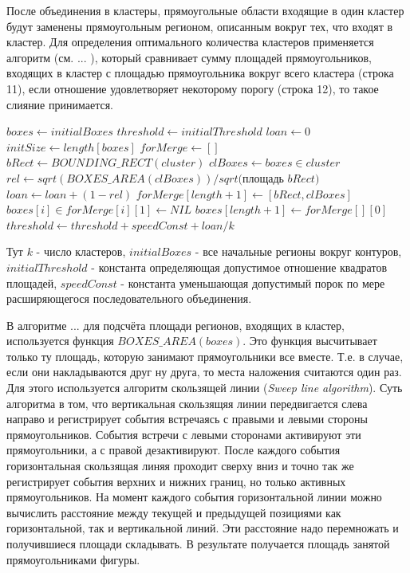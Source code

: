 \documentclass[12pt]{report}
\begin{document}
После объединения в кластеры, прямоугольные области входящие в один кластер будут заменены прямоугольным регионом, 
описанным вокруг тех, что входят в кластер. Для определения оптимального количества кластеров применяется алгоритм 
(см. ... ), который сравнивает сумму площадей прямоугольников, входящих в кластер с площадью прямоугольника вокруг 
всего кластера (строка 11), если отношение удовлетворяет некоторому порогу (строка 12), то такое слияние 
принимается.
\begin{algorithmic}[1]
\STATE $boxes \gets initialBoxes$
\STATE $threshold \gets initialThreshold$
\STATE $loan \gets 0$
\REPEAT
\STATE $initSize \gets length[boxes]$
\STATE $forMerge \gets []$
\STATE $bRect\gets BOUNDING\_RECT(cluster)$
\STATE $clBoxes\gets boxes \in cluster$
\STATE $rel\gets sqrt(BOXES\_AREA(clBoxes))/sqrt($площадь $bRect)$
\STATE $loan \gets loan + (1 - rel)$
\STATE $forMerge[length+1] \gets [bRect, clBoxes]$
\ENDIF
\ENDFOR
\STATE $boxes[i] \in forMerge[i][1] \gets NIL$
\STATE $boxes[length+1] \gets forMerge[][0]$
\STATE $threshold \gets threshold + speedConst + loan/k$
\ENDFOR
{}
\end{algorithmic}
Тут $k$ - число кластеров, $initialBoxes$ - все начальные регионы вокруг контуров, $initialThreshold$ - константа 
определяющая допустимое отношение квадратов площадей, $speedConst$ - константа уменьшающая допустимый порок по мере 
расширяющегося последовательного объединения. 

В алгоритме ...  для подсчёта площади регионов, входящих в кластер, используется функция $BOXES\_AREA(boxes)$. Это 
функция высчитывает только ту площадь, которую занимают прямоугольники все вместе. Т.е. в случае, если они 
накладываются друг ну друга, то места наложения считаются один раз. Для этого используется алгоритм скользящей 
линии 
(\textit{Sweep line algorithm}). Суть алгоритма в том, что вертикальная скользящяя линии передвигается слева 
направо 
и регистрирует события встречаясь с правыми и левыми стороны прямоугольников. События встречи с левыми сторонами 
активируют эти прямоугольники, а с правой дезактивируют. После каждого события горизонтальная скользящая линяя 
проходит сверху вниз и точно так же регистрирует события верхних и нижних границ, но только активных 
прямоугольников. 
На момент каждого события горизонтальной линии можно вычислить расстояние между текущей и предыдущей позициями как 
горизонтальной, так и вертикальной линий. Эти расстояние надо перемножать и получившиеся площади складывать. В 
результате получается площадь занятой прямоугольниками фигуры.
\end{document}
